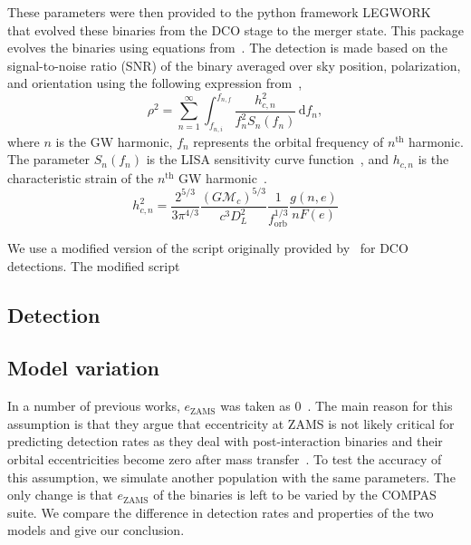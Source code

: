 These parameters were then provided to the python framework LEGWORK~\cite{wagg2021legwork} that evolved these binaries from the DCO stage to the merger state.
This package evolves the binaries using equations from~\cite{Peters1963, Peters1964}.
The detection is made based on the signal-to-noise ratio (SNR) of the binary averaged over sky position, polarization, and orientation using the following expression from~\cite{Finn2000},
\begin{equation}
    \rho^2 = \sum_{n=1}^{\infty}\int_{f_{n, i}}^{f_{n, f}}\frac{h_{c, n}^2}{f_n^2 S_n(f_n)}\,\text{d}f_n,
\end{equation}
where $n$ is the GW harmonic, $f_n$ represents the orbital frequency of $n^\text{th}$ harmonic.
The parameter $S_n(f_n)$ is the LISA sensitivity curve function~\cite{Robson2019}, and $h_{c, n}$ is the characteristic strain of the $n^\text{th}$ GW harmonic~\cite{Barack2004}.
\begin{equation}
    h_{c,n}^2 = \frac{2^{5/3}}{3\pi^{4/3}}\frac{(G\mathcal{M}_c)^{5/3}}{c^3 D_L^2}\frac{1}{f_\text{orb}^{1/3}}\frac{g
        (n, e)}{nF(e)}
\end{equation}

We use a modified version of the script originally provided by~\cite{wagg2021gravitational} for DCO detections.
The modified script

\subsection{Detection}\label{subsec:d}

\subsection{Model variation} \label{subsec:mv}
In a number of previous works, $e_\text{ZAMS}$ was taken as $0$~\cite{Vigna2018, Barrett2018, Lau2020,
    Broekgaarden2021, wagg2021gravitational}.
The main reason for this assumption is that they argue that eccentricity at ZAMS is not likely critical for predicting detection rates as they deal with post-interaction binaries and their orbital eccentricities become zero after mass transfer~\cite{Hurley2002}. %
To test the accuracy of this assumption, we simulate another population with the same parameters.
The only change is that $e_\text{ZAMS}$ of the binaries is left to be varied by the COMPAS suite.
We compare the difference in detection rates and properties of the two models and give our conclusion.

